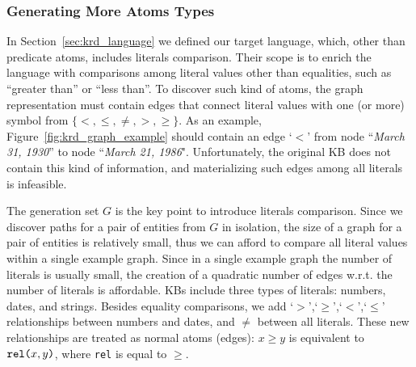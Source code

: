 %
\vspace{-1ex}
\subsubsection*{Generating More Atoms Types}


\vspace{0.5ex}
In Section~\ref{sec:krd_language} we defined our target language, which, other than predicate atoms, includes literals comparison. 
Their scope is to enrich the language with comparisons among literal values other than equalities, such as ``greater than'' or ``less than''. To discover such kind of atoms, the graph representation must contain edges that connect literal values with one (or more) symbol from $\{<,\leq,\neq,>,\geq\}$. As an example, Figure~\ref{fig:krd_graph_example} should contain an edge `$<$' from node ``\textit{March 31, 1930}'' to node ``\textit{March 21, 1986}". Unfortunately, the original KB does not contain this kind of information, and materializing such edges among all literals is infeasible.

The generation set $G$ is the key point to introduce literals comparison.
Since we discover paths for a pair of entities from $G$ in isolation, the size of a graph for a pair of entities is relatively small, thus we can afford to compare all literal values within a single example graph. Since in a single example graph the number of literals is usually small, the creation of a quadratic number of edges w.r.t. the number of literals is affordable. 
KBs include three types of literals: numbers, dates, and strings. Besides equality comparisons, we add `$>$',`$\geq$',`$<$',`$\leq$' relationships between numbers and dates, and $\neq$ between all literals. These new relationships are treated as normal atoms (edges): $x \geq y$ is equivalent to $\texttt{rel(}x,y\texttt{)}$, where \texttt{rel} is equal to $\geq$. 

